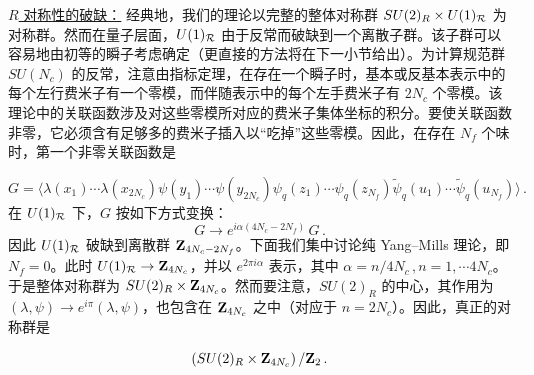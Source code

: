 \noindent\underline{$R$ 对称性的破缺：}
经典地，我们的理论以完整的整体对称群 $SU(2)_R\times U(1)_{\cal R}$ 为对称群。然而在量子层面，$U(1)_{\cal R}$ 由于反常而破缺到一个离散子群。该子群可以容易地由初等的瞬子考虑确定（更直接的方法将在下一小节给出）。为计算规范群 $SU(N_c)$ 的反常，注意由指标定理，在存在一个瞬子时，基本或反基本表示中的每个左行费米子有一个零模，而伴随表示中的每个左手费米子有 $2N_c$ 个零模。该理论中的关联函数涉及对这些零模所对应的费米子集体坐标的积分。要使关联函数非零，它必须含有足够多的费米子插入以“吃掉”这些零模。因此，在存在 $N_f$ 个味时，第一个非零关联函数是

\begin{equation}
G=\langle\lambda(x_1)\cdots\lambda(x_{2N_c})\psi(y_1)\cdots\psi(y_{2N_c})
\psi_q(z_1)\cdots\psi_q(z_{N_f})\widetilde\psi_q(u_1)\cdots
\widetilde\psi_q(u_{N_f})\rangle \,.
\label{G}
\end{equation}
在 $U(1)_{\cal R}$ 下，$G$ 按如下方式变换：
$$
G \rightarrow e^{i\alpha(4N_c-2N_f)}\,G\,.
$$
因此 $U(1)_{\cal R}$ 破缺到离散群 ${\bf Z}_{4N_c-2N_f}$。下面我们集中讨论纯 Yang--Mills 理论，即 $N_f=0$。此时 $U(1)_{\cal R}\rightarrow {\bf Z}_{4N_c}$，并以 $e^{2\pi i\alpha}$ 表示，其中 $\alpha=n/4N_c\,, n=1,\cdots 4N_c$。于是整体对称群为 $SU(2)_R\times {\bf Z}_{4N_c}$。然而要注意，$SU(2)_R$ 的中心，其作用为 $(\lambda,\psi)\rightarrow e^{i\pi}(\lambda,\psi)$，也包含在 ${\bf Z}_{4N_c}$ 之中（对应于 $n=2N_c$）。因此，真正的对称群是


$$
\left(SU(2)_R\times {\bf Z}_{4N_c}\right)/{\bf Z}_2\,.
$$

